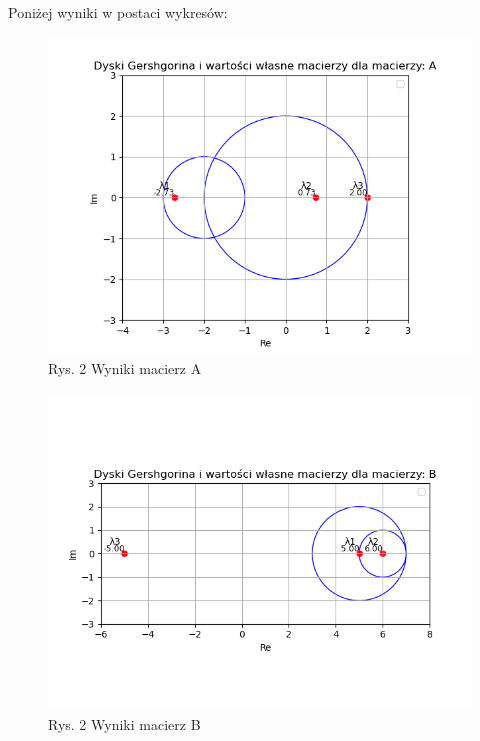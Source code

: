 \documentclass{article}
\begin{document}
Poniżej wyniki w postaci wykresów:
\begin{figure}[!h]
\includegraphics[scale=0.5]{matrixA.png}
\centering
\caption*{Rys. 2 Wyniki macierz A}
\end{figure}

\begin{figure}[!h]
\includegraphics[scale=0.5]{matrixB.png}
\centering
\caption*{Rys. 2 Wyniki macierz B}
\end{figure}
\end{document}
